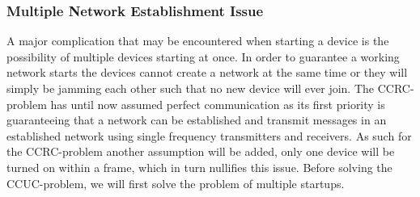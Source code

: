 \subsubsection*{Multiple Network Establishment Issue}\label{msiCCRC}
A major complication that may be encountered when starting a device is the possibility of multiple devices starting at once.
In order to guarantee a working network starts the devices cannot create a network at the same time or they will simply be jamming each other such that no new device will ever join.
The CCRC-problem has until now assumed perfect communication as its first priority is guaranteeing that a network can be established and transmit messages in an established network using single frequency transmitters and receivers.
As such for the CCRC-problem another assumption will be added, only one device will be turned on within a frame, which in turn nullifies this issue.
Before solving the CCUC-problem, we will first solve the problem of multiple startups.